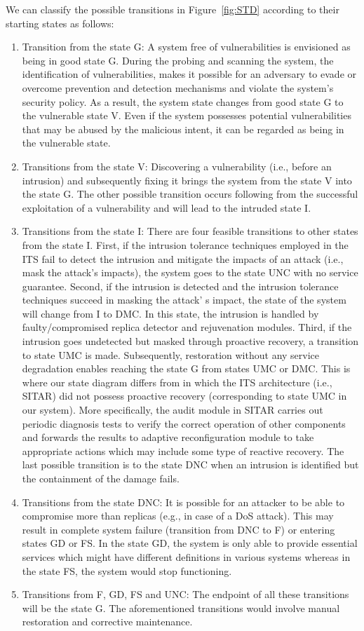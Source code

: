 \documentclass[preprint,number,12pt]{elsarticle}
\begin{document}
We can classify the possible transitions in Figure~\ref{fig:STD} according to their starting states as follows:
\begin {enumerate}
\item Transition from the state G: A system free of vulnerabilities is envisioned as being in good state G. During the probing and scanning the system, the identification of vulnerabilities, makes it possible for an adversary to evade or overcome prevention and detection mechanisms and violate the system's security policy. As a result, the system state changes from good state G to the vulnerable state V. Even if the system possesses potential vulnerabilities that may be abused by the malicious intent, it can be regarded as being in the vulnerable state.
\item Transitions from the state V: Discovering a vulnerability (i.e., before an intrusion) and subsequently fixing it brings the system from the state V into the state G. The other possible transition occurs following from the successful exploitation of a vulnerability and will lead to the intruded state I.
\item Transitions from the state I: There are four feasible transitions to other states from the state I. First, if the intrusion tolerance techniques employed in the ITS fail to detect the intrusion and mitigate the impacts of an attack (i.e., mask the attack’s impacts), the system goes to the state UNC with no service guarantee. Second, if the intrusion is detected and the intrusion tolerance techniques succeed in masking the attack' s impact, the state of the system will change from I to DMC. In this state, the intrusion is handled by faulty/compromised replica detector and rejuvenation modules. Third, if the intrusion goes undetected but masked through proactive recovery, a transition to state UMC is made. Subsequently, restoration without any service degradation enables reaching the state G from states UMC or DMC. This is where our state diagram differs from\citep{Madan2004167} in which the ITS architecture (i.e., SITAR) did not possess proactive recovery (corresponding to state UMC in our system). More specifically, the audit module in SITAR carries out periodic diagnosis tests to verify the correct operation of other components and forwards the results to adaptive reconfiguration module to take appropriate actions\citep{Wang2003a} which may include some type of reactive recovery. The last possible transition is to the state DNC when an intrusion is identified but the containment of the damage fails.
\item Transitions from the state DNC: It is possible for an attacker to be able to compromise more than  replicas (e.g., in case of a DoS attack). This may result in complete system failure (transition from DNC to F) or entering states GD or FS. In the state GD, the system is only able to provide essential services which might have different definitions in various systems whereas in the state FS, the system would stop functioning.
\item Transitions from F, GD, FS and UNC: The endpoint of all these transitions will be the state G. The aforementioned transitions would involve manual restoration and corrective maintenance.
\end{enumerate}
\end{document}
